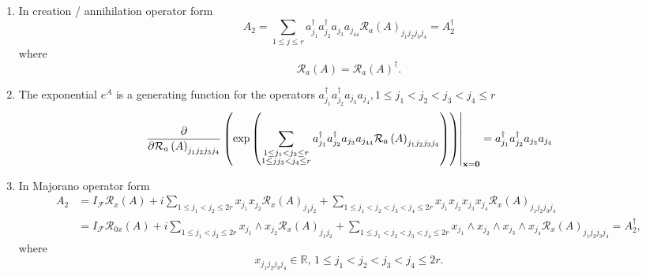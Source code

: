 \documentclass[aps,preprint]{revtex4}%
\begin{document}
\begin{enumerate}
\item In creation / annihilation operator form
\begin{equation}
A_{2}=\sum_{1\leq j\leq r}a_{j_{1}}^{\dagger}a_{j_{2}}^{\dagger}a_{j_{3}%
}a_{j_{44}}\mathcal{R}_{a}\left(  A\right)  _{j_{1}j_{2}j_{3}j_{4}}%
=A_{2}^{\dagger}%
\end{equation}
where
\begin{equation}
\mathcal{R}_{a}\left(  A\right)  =\mathcal{R}_{a}\left(  A\right)  ^{\dagger}.
\end{equation}


\item The exponential $e^{A}$ is a generating function for the operators
$a_{j_{1}}^{\dagger}a_{j_{2}}^{\dagger}a_{j_{3}}a_{j_{4}},1\leq j_{1}%
<j_{2}<j_{3}<j_{4}\leq r$
\begin{equation}
\left.  \frac{{\Large \partial}}{{\Large \partial}\mathcal{R}_{a}\left(
A\right)  _{j_{1}j_{2}j_{3}j_{4}}}\left(  \exp\left(  \sum_{\substack{1\leq
j_{1}<j_{2}\leq r\\1\leq jj_{3}<j_{4}\leq r}}a_{j_{1}}^{\dagger}a_{j_{2}%
}^{\dagger}a_{j_{3}}a_{j_{44}}\mathcal{R}_{a}\left(  A\right)  _{j_{1}%
j_{2}j_{3}j_{4}}\right)  \right)  \right\vert _{\mathbf{x=0}}=a_{j_{1}%
}^{\dagger}a_{j_{2}}^{\dagger}a_{j_{3}}a_{j_{4}}%
\end{equation}


\item In Majorano operator form%
\begin{align}
A_{2}  &  =I_{\mathcal{F}}\mathcal{R}_{x}\left(  A\right)  +i\sum_{1\leq
j_{1}<j_{2}\leq2r}x_{j_{1}}x_{j_{2}}\mathcal{R}_{x}\left(  A\right)
_{j_{1}j_{2}}+\sum_{1\leq j_{1}<j_{2}<j_{3}<j_{4}\leq2r}x_{j_{1}}x_{j_{2}%
}x_{j_{3}}x_{j_{4}}\mathcal{R}_{x}\left(  A\right)  _{j_{1}j_{2}j_{3}j_{4}}\\
&  =I_{\mathcal{F}}\mathcal{R}_{0x}\left(  A\right)  +i\sum_{1\leq j_{1}%
<j_{2}\leq2r}x_{j_{1}}\wedge x_{j_{2}}\mathcal{R}_{x}\left(  A\right)
_{j_{1}j_{2}}+\sum_{1\leq j_{1}<j_{2}<j_{3}<j_{4}\leq2r}x_{j_{1}}\wedge
x_{j_{2}}\wedge x_{j_{3}}\wedge x_{j_{4}}\mathcal{R}_{x}\left(  A\right)
_{j_{1}j_{2}j_{3}j_{4}}=A_{2}^{\dagger},
\end{align}
where
\begin{equation}
x_{j_{1}j_{2}j_{3}j_{4}}\in\mathbb{R},\,1\leq j_{1}<j_{2}<j_{3}<j_{4}\leq2r.
\end{equation}



\end{enumerate}
\end{document}
